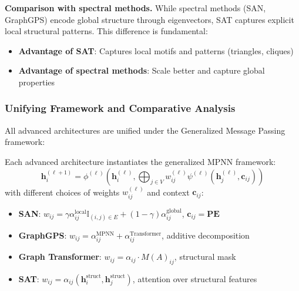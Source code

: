 \textbf{Comparison with spectral methods.}\label{rem:sat_vs_spectral} While spectral methods (SAN, GraphGPS) encode global structure through eigenvectors, SAT captures explicit local structural patterns. This difference is fundamental:
\begin{itemize}
    \item \textbf{Advantage of SAT}: Captures local motifs and patterns (triangles, cliques)
    \item \textbf{Advantage of spectral methods}: Scale better and capture global properties
\end{itemize}

\subsubsection{Unifying Framework and Comparative Analysis}\label{subsubsec:unified_framework_advanced}

All advanced architectures are unified under the Generalized Message Passing framework:

\begin{proposition}\label{prop:unified_advanced_architectures}
Each advanced architecture instantiates the generalized MPNN framework:
\begin{equation}
    \mathbf{h}_i^{(\ell+1)} = \phi^{(\ell)}\left(\mathbf{h}_i^{(\ell)}, \bigoplus_{j \in V} w_{ij}^{(\ell)} \psi^{(\ell)}(\mathbf{h}_j^{(\ell)}, \mathbf{c}_{ij})\right)
    \label{eq:unified_mpnn_generalized}
\end{equation}
with different choices of weights $w_{ij}^{(\ell)}$ and context $\mathbf{c}_{ij}$:
\begin{itemize}
    \item \textbf{SAN}: $w_{ij} = \gamma \alpha_{ij}^{\text{local}} \mathbb{I}_{(i,j) \in E} + (1-\gamma) \alpha_{ij}^{\text{global}}$, $\mathbf{c}_{ij} = \mathbf{PE}$
    \item \textbf{GraphGPS}: $w_{ij} = \alpha_{ij}^{\text{MPNN}} + \alpha_{ij}^{\text{Transformer}}$, additive decomposition
    \item \textbf{Graph Transformer}: $w_{ij} = \alpha_{ij} \cdot M(A)_{ij}$, structural mask
    \item \textbf{SAT}: $w_{ij} = \alpha_{ij}(\mathbf{h}_i^{\text{struct}}, \mathbf{h}_j^{\text{struct}})$, attention over structural features
\end{itemize}
\end{proposition}


